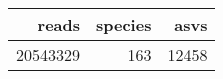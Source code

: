 \begin{longtable}{rrr}
  \hline
reads & species & asvs \\ 
  \hline
20543329 & 163 & 12458 \\ 
   \hline
\hline
\end{longtable}
